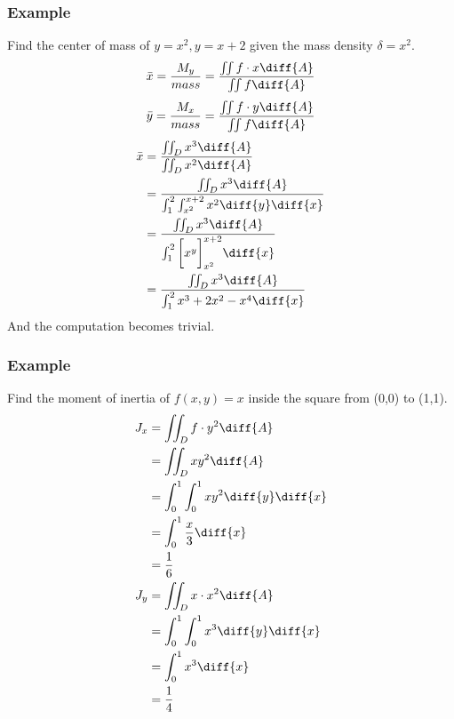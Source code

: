 \documentclass{math}
\begin{document}
\subsubsection*{Example}
Find the center of mass of \( y = x^2, y = x+2 \) given the mass density
\( \delta = x^2 \).
\[ \bar{x} = \frac{M_y}{mass} =
  \frac{\iint f\cdot x\diff{A}}{\iint f\diff{A}} \]
\[ \bar{y} = \frac{M_x}{mass} =
  \frac{\iint f\cdot y\diff{A}}{\iint f\diff{A}} \]
\begin{align*}
  \bar{x} &= \frac{\iint_{D}x^3\diff{A}}{\iint_{D}x^2\diff{A}} \\
  &= \frac{\iint_{D}x^3\diff{A}}
    {\int_{1}^{2}\int_{x^2}^{x+2}x^2\diff{y}\diff{x}} \\
  &= \frac{\iint_{D}x^3\diff{A}}
    {\int_{1}^{2}\bigg[x^y\bigg]_{x^2}^{x+2}\diff{x}} \\
  &= \frac{\iint_{D}x^3\diff{A}}{\int_{1}^{2}x^3+2x^2-x^4\diff{x}}
\end{align*}
And the computation becomes trivial.

\subsubsection*{Example}
Find the moment of inertia of \( f(x,y) = x \) inside the square from (0,0) to
(1,1).
\begin{align*}
  J_x &= \iint_{D}f\cdot y^2\diff{A} \\
  &= \iint_{D}xy^2\diff{A} \\
  &= \int_{0}^{1}\int_{0}^{1}xy^2\diff{y}\diff{x} \\
  &= \int_{0}^{1}\frac{x}{3}\diff{x} \\
  &= \frac{1}{6} \\
  J_y &= \iint_{D}x\cdot x^2\diff{A} \\
  &= \int_{0}^{1}\int_{0}^{1}x^3\diff{y}\diff{x} \\
  &= \int_{0}^{1}x^3\diff{x} \\
  &= \frac{1}{4}
\end{align*}
\end{document}
